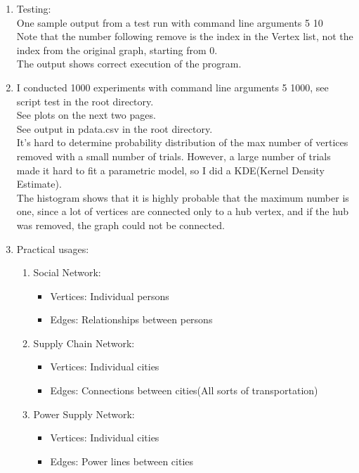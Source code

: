\documentclass{article}
\begin{document}
	\begin{enumerate}
		\item
		Testing:\\
		One sample output from a test run with command line arguments 5 10\\
		
		Note that the number following remove is the index in the Vertex list, not the index from the original graph, starting from 0.\\
		The output shows correct execution of the program.\\
		\item 
		I conducted 1000 experiments with command line arguments 5 1000, see script test in the root directory.\\
		See plots on the next two pages.\\
		See output in pdata.csv in the root directory.\\
		It's hard to determine probability distribution of the max number of vertices removed with a small number of trials. However, a large number of trials made it hard to fit a parametric model, so I did a KDE(Kernel Density Estimate).\\
		The histogram shows that it is highly probable that the maximum number is one, since a lot of vertices are connected only to a hub vertex, and if the hub was removed, the graph could not be connected.\\
		
		\newpage
		\item 
		Practical usages:\\
		\begin{enumerate}
			\item 
			Social Network:\\
			\begin{itemize}
				\item 
				Vertices: Individual persons\\
				\item 
				Edges: Relationships between persons\\
			\end{itemize}
			\item 
			Supply Chain Network:\\
			\begin{itemize}
				\item 
				Vertices: Individual cities\\
				\item 
				Edges: Connections between cities(All sorts of transportation)\\
			\end{itemize}
			\item 
			Power Supply Network:
			\begin{itemize}
				\item
				Vertices: Individual cities\\
				\item 
				Edges: Power lines between cities\\
			\end{itemize}
		\end{enumerate}
	\end{enumerate}
\end{document}
